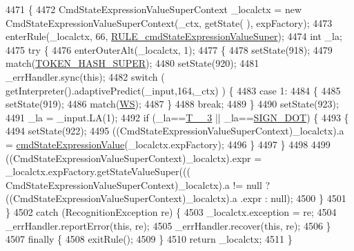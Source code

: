 \begin{DoxyCode}
4471                                                                                                            
                                     \{
4472     CmdStateExpressionValueSuperContext \_localctx = \textcolor{keyword}{new} CmdStateExpressionValueSuperContext(\_ctx, getState(
      ), expFactory);
4473     enterRule(\_localctx, 66, \hyperlink{classgov_1_1nasa_1_1jpf_1_1inspector_1_1server_1_1expression_1_1parser_1_1_expression_grammar_parser_a82d377f6d153352cce5e4f9e02ae1a6c}{RULE\_cmdStateExpressionValueSuper});
4474     \textcolor{keywordtype}{int} \_la;
4475     \textcolor{keywordflow}{try} \{
4476       enterOuterAlt(\_localctx, 1);
4477       \{
4478       setState(918);
4479       match(\hyperlink{classgov_1_1nasa_1_1jpf_1_1inspector_1_1server_1_1expression_1_1parser_1_1_expression_grammar_parser_a38960ebfcc4708bdf542ce8956dedbbe}{TOKEN\_HASH\_SUPER});
4480       setState(920);
4481       \_errHandler.sync(\textcolor{keyword}{this});
4482       \textcolor{keywordflow}{switch} ( getInterpreter().adaptivePredict(\_input,164,\_ctx) ) \{
4483       \textcolor{keywordflow}{case} 1:
4484         \{
4485         setState(919);
4486         match(\hyperlink{classgov_1_1nasa_1_1jpf_1_1inspector_1_1server_1_1expression_1_1parser_1_1_expression_grammar_parser_ace44714ae633c7b14794cc5a24d9ebf3}{WS});
4487         \}
4488         \textcolor{keywordflow}{break};
4489       \}
4490       setState(923);
4491       \_la = \_input.LA(1);
4492       \textcolor{keywordflow}{if} (\_la==\hyperlink{classgov_1_1nasa_1_1jpf_1_1inspector_1_1server_1_1expression_1_1parser_1_1_expression_grammar_parser_a68f9589dcc3fc777455467ff010385ea}{T\_\_3} || \_la==\hyperlink{classgov_1_1nasa_1_1jpf_1_1inspector_1_1server_1_1expression_1_1parser_1_1_expression_grammar_parser_af578d1cac8553bcf6f52608a4e9125f1}{SIGN\_DOT}) \{
4493         \{
4494         setState(922);
4495         ((CmdStateExpressionValueSuperContext)\_localctx).a = 
      \hyperlink{classgov_1_1nasa_1_1jpf_1_1inspector_1_1server_1_1expression_1_1parser_1_1_expression_grammar_parser_a9c38888905b31e514c2e4a695b8b2be6}{cmdStateExpressionValue}(\_localctx.expFactory);
4496         \}
4497       \}
4498 
4499        ((CmdStateExpressionValueSuperContext)\_localctx).expr =  \_localctx.expFactory.getStateValueSuper(((
      CmdStateExpressionValueSuperContext)\_localctx).a != null ? ((CmdStateExpressionValueSuperContext)\_localctx).a
      .expr : null); 
4500       \}
4501     \}
4502     \textcolor{keywordflow}{catch} (RecognitionException re) \{
4503       \_localctx.exception = re;
4504       \_errHandler.reportError(\textcolor{keyword}{this}, re);
4505       \_errHandler.recover(\textcolor{keyword}{this}, re);
4506     \}
4507     \textcolor{keywordflow}{finally} \{
4508       exitRule();
4509     \}
4510     \textcolor{keywordflow}{return} \_localctx;
4511   \}
\end{DoxyCode}
